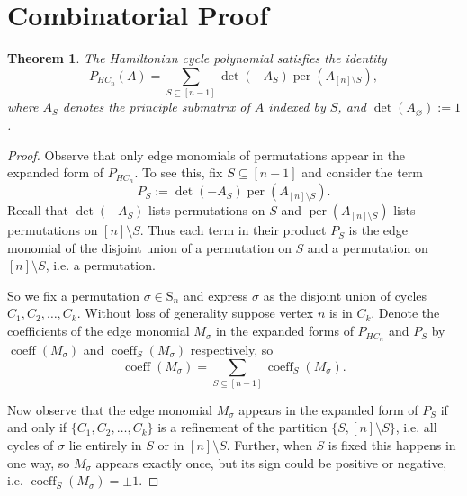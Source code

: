 \documentclass{article}
\newcommand{\per}{\operatorname{per}}
\newcommand{\coeff}{\operatorname{coeff}}
\newcommand{\Sn}{{\text{S}_n}}
\theoremstyle{theorem}
\newtheorem*{thm*}{Theorem}
\theoremstyle{definition}
\begin{document}
\section{Combinatorial Proof}\label{s:cproof}

\begin{thm*}
    The Hamiltonian cycle polynomial satisfies the identity
    \[
        P_{HC_n}(A)=\sum_{S\subseteq [n-1]}\det(-A_S)\per(A_{[n]\setminus S}),
    \]
    where $A_S$ denotes the principle submatrix of $A$ indexed by $S$, and $\det(A_{\varnothing}):=1$.
\end{thm*}

\begin{proof}
    Observe that only edge monomials of permutations appear in the expanded form of $P_{HC_n}$. To see this, fix $S\subseteq[n-1]$ and consider the term
    \[
    P_S:=\det(-A_S)\per(A_{[n]\setminus S}).
    \]
    Recall that $\det(-A_S)$ lists permutations on $S$ and $\per(A_{[n]\setminus S})$ lists permutations on $[n]\setminus S$. Thus each term in their product $P_S$ is the edge monomial of the disjoint union of a permutation on $S$ and a permutation on $[n]\setminus S$, i.e. a permutation.

    So we fix a permutation $\sigma\in\Sn$ and express $\sigma$ as the disjoint union of cycles $C_1,C_2,\hdots,C_k$. Without loss of generality suppose vertex $n$ is in $C_k$. Denote the coefficients of the edge monomial $M_\sigma$ in the expanded forms of $P_{HC_n}$ and $P_S$ by $\coeff(M_\sigma)$ and $\coeff_S(M_\sigma)$ respectively, so
    \[
        \coeff(M_\sigma)=\sum_{S\subseteq[n-1]}\coeff_S(M_\sigma).
    \]

    Now observe that the edge monomial $M_\sigma$ appears in the expanded form of $P_S$ if and only if $\{C_1,C_2,\hdots,C_k\}$ is a refinement of the partition $\{S,[n]\setminus S\}$, i.e. all cycles of $\sigma$ lie entirely in $S$ or in $[n]\setminus S$. Further, when $S$ is fixed this happens in one way, so $M_\sigma$ appears exactly once, but its sign could be positive or negative, i.e. $\coeff_S(M_\sigma)=\pm1$.
    

\end{proof}
\end{document}
